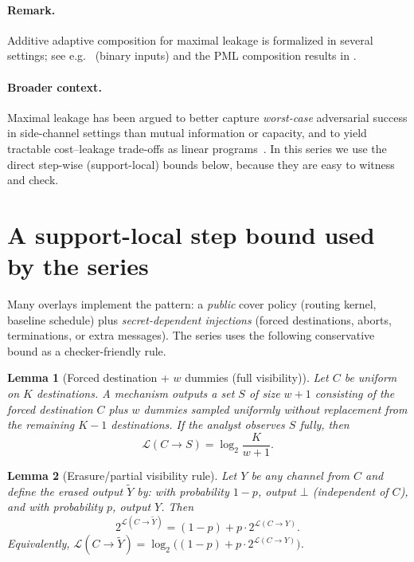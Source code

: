 \documentclass[11pt]{article}
\newcommand{\MaxL}{\mathcal{L}}
\newcommand{\logtwo}{\log_2}
\newtheorem{lemma}{Lemma}
\begin{document}
\paragraph{Remark.} Additive adaptive composition for maximal leakage is formalized in several settings; see e.g.\ \cite{issa2022adaptive} (binary inputs) and the PML composition results in \cite{saeidian2023pml}.



\paragraph{Broader context.}
Maximal leakage has been argued to better capture \emph{worst-case} adversarial success in side-channel settings than mutual information or capacity, and to yield tractable cost--leakage trade-offs as linear programs~\cite{wu2020sidechannel}.
In this series we use the direct step-wise (support-local) bounds below, because they are easy to witness and check.

\section{A support-local step bound used by the series}\label{sec:supportlocal}
Many overlays implement the pattern:
a \emph{public} cover policy (routing kernel, baseline schedule) plus \emph{secret-dependent injections} (forced destinations, aborts, terminations, or extra messages).
The series uses the following conservative bound as a checker-friendly rule.

\begin{lemma}[Forced destination + $w$ dummies (full visibility)]\label{lem:forced_dest_full}
Let $C$ be uniform on $K$ destinations.
A mechanism outputs a set $S$ of size $w{+}1$ consisting of the forced destination $C$ plus $w$ dummies sampled uniformly without replacement from the remaining $K{-}1$ destinations.
If the analyst observes $S$ fully, then
\[
\MaxL(C\!\to\!S)=\logtwo\frac{K}{w+1}.
\]
\end{lemma}

\begin{lemma}[Erasure/partial visibility rule]\label{lem:erasure}
Let $Y$ be any channel from $C$ and define the \emph{erased} output $\tilde Y$ by:
with probability $1-p$, output $\bot$ (independent of $C$), and with probability $p$, output $Y$.
Then
\[
2^{\MaxL(C\to \tilde Y)} = (1-p) + p\cdot 2^{\MaxL(C\to Y)}.
\]
Equivalently, $\MaxL(C\to \tilde Y)=\logtwo\!\big((1-p)+p\cdot 2^{\MaxL(C\to Y)}\big)$.
\end{lemma}
\end{document}
